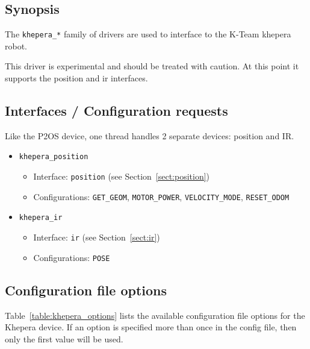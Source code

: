 \subsection*{Synopsis}
The {\tt khepera\_*} family of drivers are used to interface to the K-Team khepera robot. 

This driver is experimental and should be treated with caution. At this point it supports the position and ir interfaces.

\subsection*{Interfaces / Configuration requests}
Like the P2OS device, one thread handles 2 separate devices: position and IR. 
\begin{itemize}
	\item \texttt{khepera\_position}
	\begin{itemize}
		\item Interface: {\tt position} (see Section~\ref{sect:position})
		\item Configurations: {\tt GET\_GEOM}, {\tt MOTOR\_POWER}, 
			{\tt VELOCITY\_MODE}, {\tt RESET\_ODOM}
		\end{itemize}
	
	\item {\tt khepera\_ir}
	
	\begin{itemize}
		\item Interface: {\tt ir} (see Section~\ref{sect:ir})
		\item Configurations: {\tt POSE}
	\end{itemize}

\end{itemize}
\subsection*{Configuration file options}
Table~\ref{table:khepera_options} lists the available configuration file options for the Khepera device.  If an option is specified more than once in the config file, then only the first value will be used.

